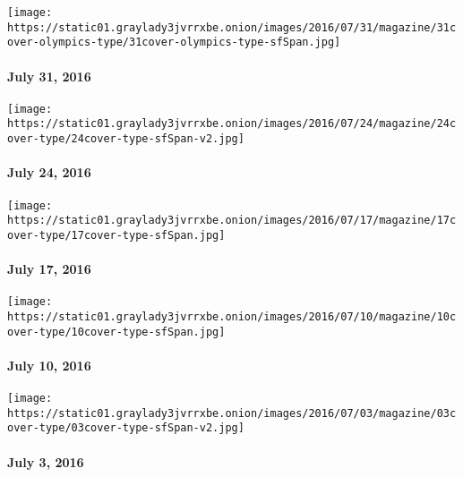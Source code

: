\href{http://www.nytimes3xbfgragh.onion/indexes/2016/07/31/magazine/index.html}{}

\texttt{[image: https://static01.graylady3jvrrxbe.onion/images/2016/07/31/magazine/31cover-olympics-type/31cover-olympics-type-sfSpan.jpg]}

\hypertarget{july-31-2016}{%
\paragraph{July 31, 2016}\label{july-31-2016}}

\href{http://www.nytimes3xbfgragh.onion/indexes/2016/07/24/magazine/index.html}{}

\texttt{[image: https://static01.graylady3jvrrxbe.onion/images/2016/07/24/magazine/24cover-type/24cover-type-sfSpan-v2.jpg]}

\hypertarget{july-24-2016}{%
\paragraph{July 24, 2016}\label{july-24-2016}}

\href{http://www.nytimes3xbfgragh.onion/indexes/2016/07/17/magazine/index.html}{}

\texttt{[image: https://static01.graylady3jvrrxbe.onion/images/2016/07/17/magazine/17cover-type/17cover-type-sfSpan.jpg]}

\hypertarget{july-17-2016}{%
\paragraph{July 17, 2016}\label{july-17-2016}}

\href{http://www.nytimes3xbfgragh.onion/indexes/2016/07/10/magazine/index.html}{}

\texttt{[image: https://static01.graylady3jvrrxbe.onion/images/2016/07/10/magazine/10cover-type/10cover-type-sfSpan.jpg]}

\hypertarget{july-10-2016}{%
\paragraph{July 10, 2016}\label{july-10-2016}}

\href{http://www.nytimes3xbfgragh.onion/indexes/2016/07/03/magazine/index.html}{}

\texttt{[image: https://static01.graylady3jvrrxbe.onion/images/2016/07/03/magazine/03cover-type/03cover-type-sfSpan-v2.jpg]}

\hypertarget{july-3-2016}{%
\paragraph{July 3, 2016}\label{july-3-2016}}

